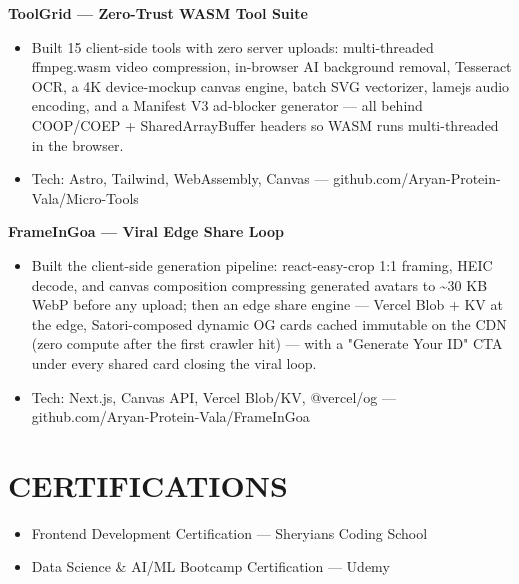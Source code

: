 \documentclass[9pt]{article}
\begin{document}
\textbf{ToolGrid  ---  Zero-Trust WASM Tool Suite}
\vspace{1pt}
\begin{itemize}[leftmargin=11pt,itemsep=0pt,topsep=1pt,parsep=0pt]
\item Built 15 client-side tools with zero server uploads: multi-threaded ffmpeg.wasm video compression, in-browser AI background removal, Tesseract OCR, a 4K device-mockup canvas engine, batch SVG vectorizer, lamejs audio encoding, and a Manifest V3 ad-blocker generator  ---  all behind COOP/COEP + SharedArrayBuffer headers so WASM runs multi-threaded in the browser.
\item Tech: Astro, Tailwind, WebAssembly, Canvas  ---  github.com/Aryan-Protein-Vala/Micro-Tools
\end{itemize}
\textbf{FrameInGoa  ---  Viral Edge Share Loop}
\vspace{1pt}
\begin{itemize}[leftmargin=11pt,itemsep=0pt,topsep=1pt,parsep=0pt]
\item Built the client-side generation pipeline: react-easy-crop 1:1 framing, HEIC decode, and canvas composition compressing generated avatars to \textasciitilde{}30 KB WebP before any upload; then an edge share engine  ---  Vercel Blob + KV at the edge, Satori-composed dynamic OG cards cached immutable on the CDN (zero compute after the first crawler hit)  ---  with a "Generate Your ID" CTA under every shared card closing the viral loop.
\item Tech: Next.js, Canvas API, Vercel Blob/KV, @vercel/og  ---  github.com/Aryan-Protein-Vala/FrameInGoa
\end{itemize}
\section*{CERTIFICATIONS}
\begin{itemize}[leftmargin=11pt,itemsep=0pt,topsep=1pt,parsep=0pt]
\item Frontend Development Certification  ---  Sheryians Coding School
\item Data Science \& AI/ML Bootcamp Certification  ---  Udemy
\end{itemize}
\end{document}
